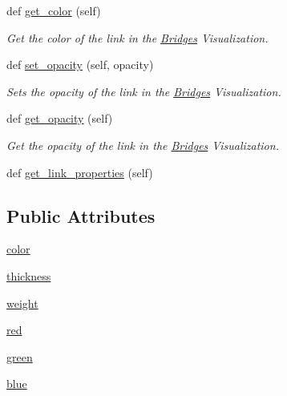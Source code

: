 \begin{DoxyCompactItemize}
def \hyperlink{class_bridges_1_1_link_visualizer_1_1_link_visualizer_ac8856286df8b7bbbf36a6d97e0ee7c0a}{get\+\_\+color} (self)
\begin{DoxyCompactList}\small\item\em Get the color of the link in the \hyperlink{namespace_bridges_1_1_bridges}{Bridges} Visualization. \end{DoxyCompactList}\item 
def \hyperlink{class_bridges_1_1_link_visualizer_1_1_link_visualizer_a44411f855d60c20b267f1178add887bb}{set\+\_\+opacity} (self, opacity)
\begin{DoxyCompactList}\small\item\em Sets the opacity of the link in the \hyperlink{namespace_bridges_1_1_bridges}{Bridges} Visualization. \end{DoxyCompactList}\item 
def \hyperlink{class_bridges_1_1_link_visualizer_1_1_link_visualizer_a87be28711f26ade5bc0125d316bf1705}{get\+\_\+opacity} (self)
\begin{DoxyCompactList}\small\item\em Get the opacity of the link in the \hyperlink{namespace_bridges_1_1_bridges}{Bridges} Visualization. \end{DoxyCompactList}\item 
def \hyperlink{class_bridges_1_1_link_visualizer_1_1_link_visualizer_aa2d8f801447cbb9681a1312300e7980a}{get\+\_\+link\+\_\+properties} (self)
\end{DoxyCompactItemize}
\subsection*{Public Attributes}
\begin{DoxyCompactItemize}
\item 
\hyperlink{class_bridges_1_1_link_visualizer_1_1_link_visualizer_ad399e71444ce7ddd0909449c12b579bf}{color}
\item 
\hyperlink{class_bridges_1_1_link_visualizer_1_1_link_visualizer_a3ac27693b0b6f7d23eaa0619d4998c64}{thickness}
\item 
\hyperlink{class_bridges_1_1_link_visualizer_1_1_link_visualizer_ad2d0f7c83100350d7d38e5eb46527f34}{weight}
\item 
\hyperlink{class_bridges_1_1_link_visualizer_1_1_link_visualizer_a35b9ab7e92a3af0908966ca3b9fa2772}{red}
\item 
\hyperlink{class_bridges_1_1_link_visualizer_1_1_link_visualizer_a5cb6282f83a49fb9a128d5389fc4cecd}{green}
\item 
\hyperlink{class_bridges_1_1_link_visualizer_1_1_link_visualizer_a73ecbf45d989c54a89106ddf30ecb765}{blue}
\end{DoxyCompactItemize}
